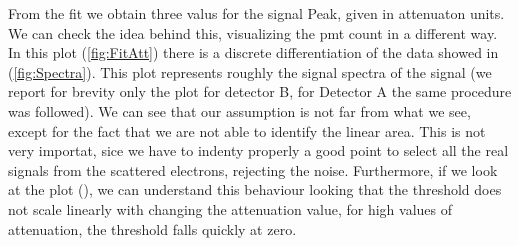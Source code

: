 \begin{figure}[hbtp]
\centering
{}
\end{figure}

From the fit we obtain three valus for the signal Peak, given in attenuaton units.
We can check the idea behind this, visualizing the pmt count in a different way. In this plot (\ref{fig:FitAtt}) there is a discrete differentiation of the data showed in (\ref{fig:Spectra}). This plot represents roughly the signal spectra of the signal (we report for brevity only the plot for detector B, for Detector A the same procedure was followed). 
We can see that our assumption is not far from what we see, except for the fact that we are not able to identify the linear area. This is not very importat, sice we have to indenty properly a good point to select all the real signals from the scattered electrons, rejecting the noise. Furthermore, if we look at the plot (), we can understand this behaviour looking that the threshold does not scale linearly with changing the attenuation value, for high values of attenuation, the threshold falls quickly at zero.

